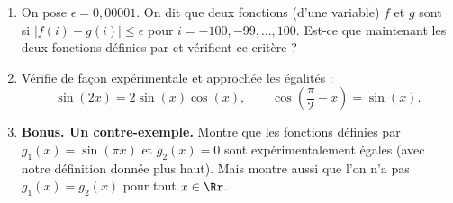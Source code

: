 \documentclass[11pt,class=report,crop=false]{standalone}
\begin{document}
\begin{activite}
\begin{enumerate}
\begin{enumerate}
    \item On pose $\epsilon = 0,00001$. On dit que deux fonctions (d'une variable) $f$ et $g$ sont  si $|f(i)-g(i)| \le \epsilon$ pour $i=-100,-99,\ldots,100$. Est-ce que maintenant les deux fonctions  définies par  et  vérifient ce critère ?
    
    \item Vérifie de façon expérimentale et approchée les égalités :
    $$\sin(2x) = 2\sin(x)\cos(x), \qquad \cos\left(\frac\pi2-x\right)=\sin(x).$$

  
  \item \textbf{Bonus. Un contre-exemple.}
  Montre que les fonctions définies par $g_1(x) = \sin(\pi x)$ et $g_2(x)=0$ sont expérimentalement égales (avec notre définition donnée plus haut). Mais montre aussi que l'on n'a pas $g_1(x) = g_2(x)$ pour tout $x\in\Rr$.
  
  \end{enumerate} 
\end{enumerate}

\end{activite}
\end{document}
